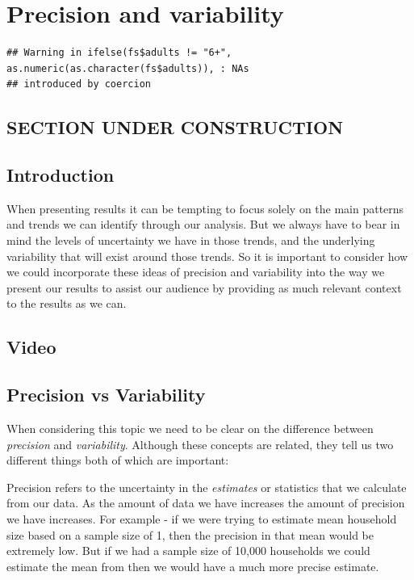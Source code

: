 \documentclass[
]{book}
\begin{document}
\hypertarget{precision}{%
\chapter{Precision and variability}\label{precision}}

\begin{verbatim}
## Warning in ifelse(fs$adults != "6+", as.numeric(as.character(fs$adults)), : NAs
## introduced by coercion
\end{verbatim}

\hypertarget{section-under-construction}{%
\section{SECTION UNDER CONSTRUCTION}\label{section-under-construction}}

\hypertarget{introduction-2}{%
\section{Introduction}\label{introduction-2}}

When presenting results it can be tempting to focus solely on the main patterns and trends we can identify through our analysis. But we always have to bear in mind the levels of uncertainty we have in those trends, and the underlying variability that will exist around those trends. So it is important to consider how we could incorporate these ideas of precision and variability into the way we present our results to assist our audience by providing as much relevant context to the results as we can.

\hypertarget{video-1}{%
\section{Video}\label{video-1}}

\hypertarget{precision-vs-variability}{%
\section{Precision vs Variability}\label{precision-vs-variability}}

When considering this topic we need to be clear on the difference between \emph{precision} and \emph{variability}. Although these concepts are related, they tell us two different things both of which are important:

Precision refers to the uncertainty in the \emph{estimates} or statistics that we calculate from our data. As the amount of data we have increases the amount of precision we have increases. For example - if we were trying to estimate mean household size based on a sample size of 1, then the precision in that mean would be extremely low. But if we had a sample size of 10,000 households we could estimate the mean from then we would have a much more precise estimate.
\end{document}
